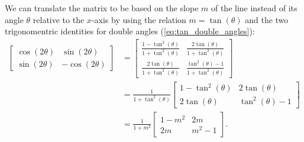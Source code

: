 \begin{descitemize}
		We can translate the matrix to be based on the slope $m$ of the line instead of its angle $\theta$ relative to the $x$-axis by using the relation $m=\tan\left(\theta\right)$ and the two trigonomentric identities for double angles (\autoref{eq:tan_double_angles}):
		\begin{align*}
			\begin{bmatrix} \cos \left( 2\theta \right) & \sin \left( 2\theta \right) \\ \sin \left( 2\theta \right) & -\cos \left( 2\theta \right) \end{bmatrix} &= \begin{bmatrix} \frac{1-\tan^{2} \left( \theta \right) }{1+\tan^{2} \left( \theta \right) } & \frac{2\tan \left( \theta \right) }{1+\tan^{2} \left( \theta \right) } \\ \frac{2\tan \left( \theta \right) }{1+\tan^{2} \left( \theta \right) } & \frac{\tan^{2} \left( \theta \right)-1 }{1+\tan^{2} \left( \theta \right) } \end{bmatrix}\\
														&= \frac{1}{1+\tan^{2} \left( \theta \right)}\begin{bmatrix} 1-\tan^{2} \left( \theta \right) & 2\tan \left( \theta \right) \\ 2\tan \left( \theta \right) & \tan^{2} \left( \theta \right) -1  \end{bmatrix}\\
														&= \frac{1}{1+m^{2}} \begin{bmatrix} 1-m^{2} & 2m \\ 2m & m^{2}-1 \end{bmatrix}.
		\end{align*}	


\end{descitemize}
